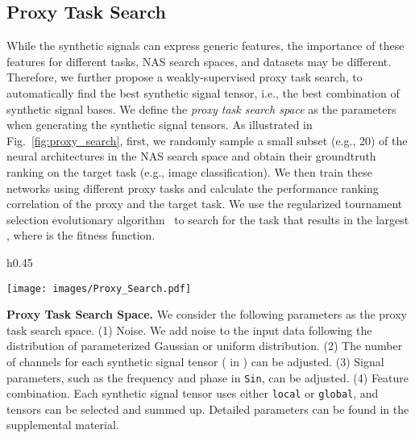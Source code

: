 \documentclass{article}
\begin{document}
\vspace{-8pt}
\subsection{Proxy Task Search} 
\label{sec:task_search}
\vspace{-4pt}

While the synthetic signals can express generic features, the importance of these features for different tasks, NAS search spaces, and datasets may be different.
Therefore, we further propose a weakly-supervised proxy task search, to automatically find the best synthetic signal tensor, i.e., the best combination of synthetic signal bases.
We define the \textit{proxy task search space} as the parameters when generating the synthetic signal tensors.
As illustrated in Fig.~\ref{fig:proxy_search}, first, we randomly sample a small subset (e.g., 20) of the neural architectures in the NAS search space and obtain their groundtruth ranking on the target task (e.g., image classification).
We then train these networks using different proxy tasks and calculate the performance ranking correlation  of the proxy and the target task.
We use the regularized tournament selection evolutionary algorithm~\cite{real2019regularized} to search for the task that results in the largest , where  is the fitness function.

\begin{wrapfigure}{h}{0.45\textwidth}
\vspace{-16pt}
  \begin{center}
    \texttt{[image: images/Proxy\_Search.pdf]}
  \end{center}
  \caption{Proxy task search.}
  \label{fig:proxy_search}
  \vspace{-16pt}
\end{wrapfigure}



\textbf{Proxy Task Search Space.} 
We consider the following parameters as the proxy task search space.
(1) Noise.
We add noise to the input data following the distribution of parameterized Gaussian or uniform distribution.
(2) The number of channels for each synthetic signal tensor ( in ) can be adjusted. 
(3) Signal parameters, such as the frequency  and phase  in \texttt{Sin}, can be adjusted.
(4) Feature combination.
Each synthetic signal tensor uses either \texttt{local} or \texttt{global}, and tensors can be selected and summed up.
Detailed parameters can be found in the supplemental material.
\end{document}
